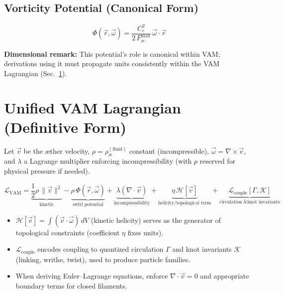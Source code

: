 \documentclass[11pt, a4paper]{article}
\begin{document}
\subsection{Vorticity Potential (Canonical Form)}

\begin{equation}
\Phi(\vec r,\vec\omega) = \frac{C_e^{2}}{2\,F_{\text{\ae}}^{\max}}\,\vec\omega\cdot\vec r
\end{equation}

\textbf{Dimensional remark:} This potential’s role is canonical within VAM; derivations using it must propagate units consistently within the VAM Lagrangian (Sec.~\ref{sec:lagrangian}).

\section{Unified VAM Lagrangian (Definitive Form)}
\label{sec:lagrangian}

Let $\vec v$ be the æther velocity, $\rho=\rho_{\text{\ae}}^{(\text{fluid})}$ constant (incompressible), $\vec\omega=\nabla\times\vec v$, and $\lambda$ a Lagrange multiplier enforcing incompressibility (with $p$ reserved for physical pressure if needed).

\begin{equation}
\mathcal{L}_{\text{VAM}} =
\underbrace{\frac{1}{2}\rho\,\lVert\vec v\rVert^{2}}_{\text{kinetic}}
- \underbrace{\rho\,\Phi(\vec r,\vec\omega)}_{\text{swirl potential}}
+ \underbrace{\lambda(\nabla\cdot\vec v)}_{\text{incompressibility}}
+ \underbrace{\eta\,\mathcal{H}[\vec v]}_{\text{helicity/topological term}}
+ \underbrace{\mathcal{L}_{\text{couple}}[\Gamma,\mathcal{K}]}_{\text{circulation \& knot invariants}}
\end{equation}

\begin{itemize}
    \item $\mathcal{H}[\vec v] = \int (\vec v\cdot\vec\omega)\,dV$ (kinetic helicity) serves as the generator of topological constraints (coefficient $\eta$ fixes units).
    \item $\mathcal{L}_{\text{couple}}$ encodes coupling to quantized circulation $\Gamma$ and knot invariants $\mathcal{K}$ (linking, writhe, twist), used to produce particle families.
    \item When deriving Euler–Lagrange equations, enforce $\nabla\cdot\vec v=0$ and appropriate boundary terms for closed filaments.
\end{itemize}
\end{document}
